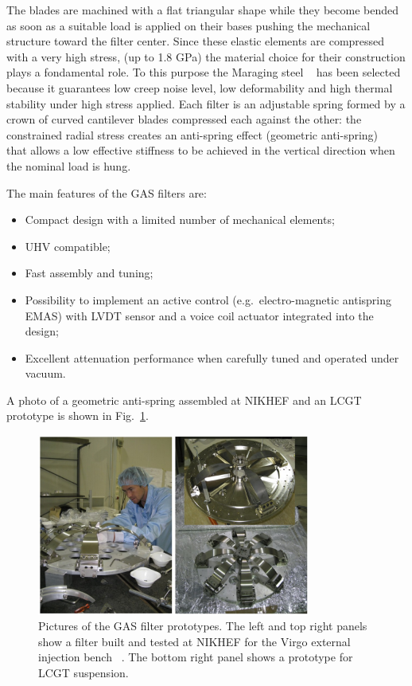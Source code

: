 The blades are machined with a flat triangular shape while they become bended as soon as 
a suitable load is applied on their bases pushing the mechanical structure toward
the filter center. Since these elastic elements are compressed with a very high stress,
(up to 1.8 GPa) the material choice for their construction plays a fondamental role. To this 
purpose the Maraging steel ~\cite{Braccini2000} has been selected because it guarantees 
low creep noise level, low deformability and high thermal stability under high stress applied.
Each filter is an adjustable spring formed by a crown of curved cantilever blades compressed 
each against the other: the constrained radial stress creates an anti-spring effect 
(geometric anti-spring)~\cite{Bertolini} that allows a low effective stiffness to be achieved 
in the vertical direction when the nominal load is hung. 

The main features of the GAS filters are:
\begin{itemize}
\item{} Compact design with a limited number of mechanical elements;
\item{} UHV compatible;
\item{} Fast assembly and tuning;
\item{} Possibility to implement an active control (e.g.\ electro-magnetic antispring EMAS) 
with LVDT sensor and a voice coil actuator integrated into the design; 
\item{} Excellent attenuation performance when carefully tuned and operated under vacuum.
\end{itemize}

A photo of a geometric anti-spring assembled at NIKHEF and an LCGT prototype is shown 
in Fig.~\ref{fig:gas_nikhef}.

\begin{figure}[htbp!]
\centering
\includegraphics[width=9cm]{./Sec_Suspensions/Figures/gas_nikhef.pdf}
\caption{Pictures of the GAS filter prototypes. The left and top right panels
show a filter built and tested at NIKHEF for the Virgo external injection bench ~\cite{nikhef}.
The bottom right panel shows a prototype for LCGT suspension.}
\label{fig:gas_nikhef}
\end{figure}

